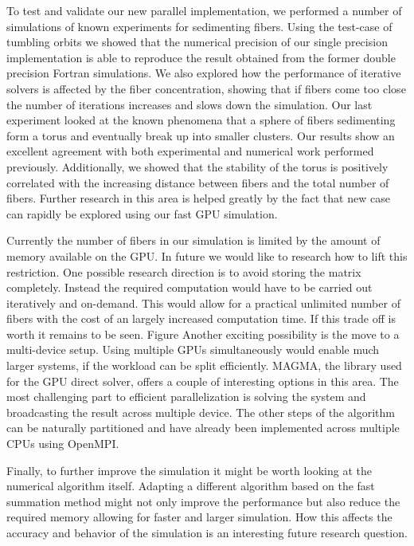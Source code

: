 To test and validate our new parallel implementation, we performed a number of simulations of known experiments for sedimenting fibers. Using the test-case of tumbling orbits we showed that the numerical precision of our single precision implementation is able to reproduce the result obtained from the former double precision Fortran simulations. We also explored how the performance of iterative solvers is affected by the fiber concentration, showing that if fibers come too close the number of iterations increases and slows down the simulation. Our last experiment looked at the known phenomena that a sphere of fibers sedimenting form a torus and eventually break up into smaller clusters. Our results show an excellent agreement with both experimental and numerical work performed previously. Additionally, we showed that the stability of the torus is positively correlated with the increasing distance between fibers and the total number of fibers. Further research in this area is helped greatly by the fact that new case can rapidly be explored using our fast GPU simulation.

Currently the number of fibers in our simulation is limited by the amount of memory available on the GPU. In future we would like to research how to lift this restriction. One possible research direction is to avoid storing the matrix completely. Instead the required computation would have to be carried out iteratively and on-demand. This would allow for a practical unlimited number of fibers with the cost of an largely increased computation time. If this trade off is worth it remains to be seen.
Figure
Another exciting possibility is the move to a multi-device setup. Using multiple GPUs simultaneously would enable much larger systems, if the workload can be split efficiently. MAGMA, the library used for the GPU direct solver, offers a couple of interesting options in this area. The most challenging part to efficient parallelization is solving the system and broadcasting the result across multiple device. The other steps of the algorithm can be naturally partitioned and have already been implemented across multiple CPUs using OpenMPI.

Finally, to further improve the simulation it might be worth looking at the numerical algorithm itself. Adapting a different algorithm based on the fast summation method might not only improve the performance but also reduce the required memory allowing for faster and larger simulation. How this affects the accuracy and behavior of the simulation is an interesting future research question.

